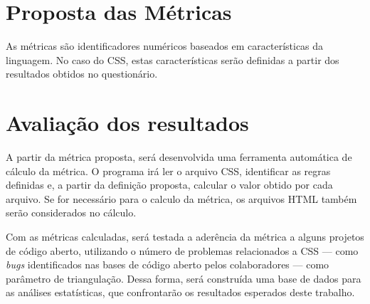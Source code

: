 \section{Proposta das Métricas}

As métricas são identificadores numéricos baseados em características da linguagem. No caso do CSS, estas características serão definidas a partir dos resultados obtidos no questionário.

\section{Avaliação dos resultados}

A partir da métrica proposta, será desenvolvida uma ferramenta automática de cálculo da métrica. O programa irá ler o arquivo CSS, identificar as regras definidas e, a partir da definição proposta, calcular o valor obtido por cada arquivo. Se for necessário para o calculo da métrica, os arquivos HTML também serão considerados no cálculo.

Com as métricas calculadas, será testada a aderência da métrica a alguns projetos de código aberto, utilizando o número de problemas relacionados a CSS --- como \textit{bugs} identificados nas bases de código aberto pelos colaboradores ---  como parâmetro de triangulação. Dessa forma, será construída uma base de dados para as análises estatísticas, que confrontarão os resultados esperados deste trabalho.

